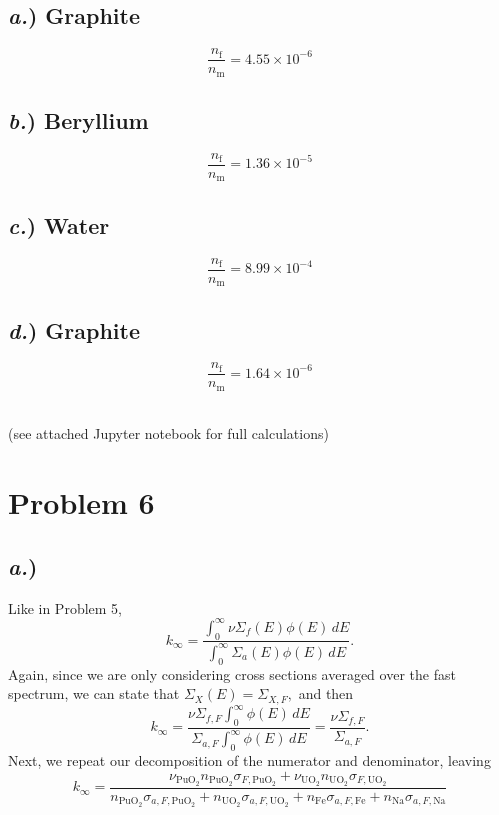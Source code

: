 \documentclass{article}
\begin{document}
\begin{multicols}{4}
\subsection*{\textit{a.}) \normalsize Graphite}
$$ \frac{n_{\text{f}}}{n_{\text{m}}} = 4.55\times10^{-6}$$

\subsection*{\textit{b.}) \normalsize Beryllium}
$$ \frac{n_{\text{f}}}{n_{\text{m}}} = 1.36\times10^{-5}$$

\subsection*{\textit{c.}) \normalsize Water}
$$ \frac{n_{\text{f}}}{n_{\text{m}}} = 8.99\times10^{-4}$$

\subsection*{\textit{d.}) \normalsize Graphite}
$$ \frac{n_{\text{f}}}{n_{\text{m}}} = 1.64\times10^{-6}$$
\end{multicols}

\-\\
(see attached Jupyter notebook for full calculations)



\newpage

\section*{Problem 6}

\subsection*{\textit{a.})}

Like in Problem 5, 
$$k_{\infty} = \frac{\int_0^{\infty} \nu \Sigma_f(E)\phi(E)\,dE}{\int_0^{\infty} \Sigma_a(E)\phi(E)\,dE} .$$
Again, since we are only considering cross sections averaged over the fast spectrum, we can state that $\Sigma_X(E) = \Sigma_{X,F},$ and then 
$$ k_{\infty} = \frac{\nu \Sigma_{f,F} \int_0^{\infty} \phi(E)\,dE}{\Sigma_{a,F} \int_0^{\infty} \phi(E)\,dE} = \frac{\nu \Sigma_{f,F}}{\Sigma_{a,F}}.$$
Next, we repeat our decomposition of the numerator and denominator, leaving 
$$ k_{\infty} = \frac{\nu_{\text{PuO}_2} n_{\text{PuO}_2} \sigma_{F,\text{PuO}_2} + \nu_{\text{UO}_2} n_{\text{UO}_2} \sigma_{F,\text{UO}_2}}{n_{\text{PuO}_2} \sigma_{a,F,\text{PuO}_2} + n_{\text{UO}_2} \sigma_{a,F,\text{UO}_2} + n_{\text{Fe}} \sigma_{a,F,\text{Fe}} + n_{\text{Na}} \sigma_{a,F,\text{Na}}} $$
\end{document}
